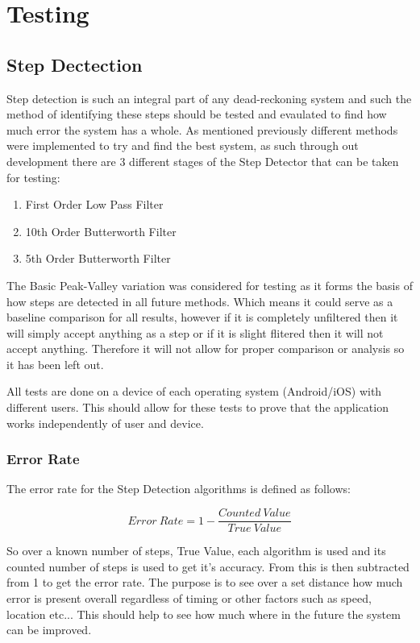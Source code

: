 \documentclass[main.tex]{subfiles}
\begin{document}
\chapter{Testing}

\section{Step Dectection}

Step detection is such an integral part of any dead-reckoning system and such the method of identifying these steps should be tested and evaulated to find how much error the system has a whole. As mentioned previously different methods were implemented to try and find the best system, as such through out development there are 3 different stages of the Step Detector that can be taken for testing:
\begin{enumerate}
	\item First Order Low Pass Filter
	\item 10th Order Butterworth Filter
	\item 5th Order Butterworth Filter
\end{enumerate}
The Basic Peak-Valley variation was considered for testing as it forms the basis of how steps are detected in all future methods. Which means it could serve as a baseline comparison for all results, however if it is completely unfiltered then it will simply accept anything as a step or if it is slight flitered then it will not accept anything. Therefore it will not allow for proper comparison or analysis so it has been left out.

All tests are done on a device of each operating system (Android/iOS) with different users. This should allow for these tests to prove that the application works independently of user and device.

\subsection{Error Rate}

The error rate for the Step Detection algorithms is defined as follows:

\begin{equation}
Error\ Rate = 1 - \frac{Counted\ Value}{True\ Value}
\end{equation}

So over a known number of steps, True Value, each algorithm is used and its counted number of steps is used to get it's accuracy. From this is then subtracted from 1 to get the error rate. The purpose is to see over a set distance how much error is present overall regardless of timing or other factors such as speed, location etc... This should help to see how much where in the future the system can be improved.
\end{document}
